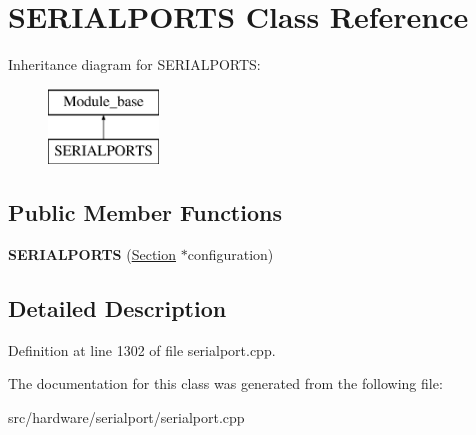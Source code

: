 \hypertarget{classSERIALPORTS}{\section{S\-E\-R\-I\-A\-L\-P\-O\-R\-T\-S Class Reference}
\label{classSERIALPORTS}
}
Inheritance diagram for S\-E\-R\-I\-A\-L\-P\-O\-R\-T\-S\-:\begin{figure}[H]
\begin{center}
\leavevmode
\includegraphics[height=2.000000cm]{classSERIALPORTS}
\end{center}
\end{figure}
\subsection*{Public Member Functions}
\begin{DoxyCompactItemize}
\item 
\hypertarget{classSERIALPORTS_a36570726a1e10f60d8d7be830141f465}{{\bfseries S\-E\-R\-I\-A\-L\-P\-O\-R\-T\-S} (\hyperlink{classSection}{Section} $\ast$configuration)}\label{classSERIALPORTS_a36570726a1e10f60d8d7be830141f465}

\end{DoxyCompactItemize}


\subsection{Detailed Description}


Definition at line 1302 of file serialport.\-cpp.



The documentation for this class was generated from the following file\-:\begin{DoxyCompactItemize}
\item 
src/hardware/serialport/serialport.\-cpp\end{DoxyCompactItemize}
